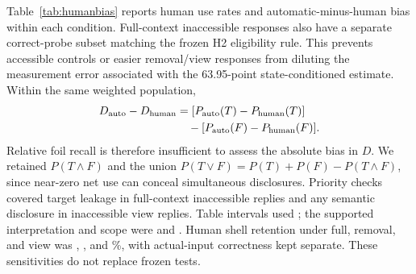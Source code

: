 Table~\ref{tab:humanbias} reports human use rates and automatic-minus-human bias within each condition. Full-context inaccessible responses also have a separate correct-probe subset matching the frozen H2 eligibility rule. This prevents accessible controls or easier removal/view responses from diluting the measurement error associated with the 63.95-point state-conditioned estimate. Within the same weighted population,
\begin{equation}
\begin{split}
 D_{\rm auto}-D_{\rm human}
 &= [P_{\rm auto}(T)-P_{\rm human}(T)]\\
 &\quad-[P_{\rm auto}(F)-P_{\rm human}(F)].
\end{split}
\label{eq:measurementbias}
\end{equation}
Relative foil recall is therefore insufficient to assess the absolute bias in $D$. We retained $P(T\land F)$ and the union $P(T\lor F)=P(T)+P(F)-P(T\land F)$, since near-zero net use can conceal simultaneous disclosures. Priority checks covered target leakage in full-context inaccessible replies and any semantic disclosure in inaccessible view replies. Table intervals used ; the supported interpretation and scope were  and . Human shell retention under full, removal, and view was , , and \%, with actual-input correctness kept separate. These sensitivities do not replace frozen tests.


